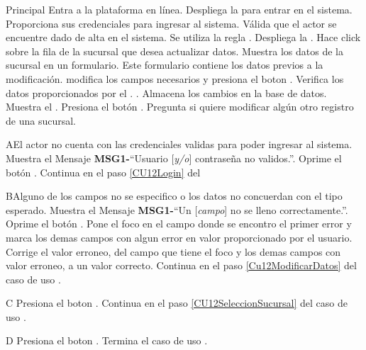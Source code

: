 	\begin{UCtrayectoria}{Principal}
		\UCpaso[\UCactor] Entra a la plataforma en línea. 
		\UCpaso Despliega la \label{CU12Login} para entrar en el sistema.
		\UCpaso[\UCactor] Proporciona sus credenciales para ingresar al sistema.
		\UCpaso Válida que el actor se encuentre dado de alta en el sistema. Se utiliza la regla  .
		\UCpaso Despliega la .\label{CU12SeleccionSucursal}
		\UCpaso[\UCactor] Hace click sobre la fila de la sucursal que desea actualizar datos.
		\UCpaso Muestra los datos de la sucursal en un formulario. Este formulario contiene los datos previos a la modificación.
		\UCpaso[\UCactor] modifica los campos necesarios y presiona el boton . \label{Cu12ModificarDatos}
		\UCpaso Verifica los datos proporcionados por el \UCactor.  .
		\UCpaso Almacena los cambios en la base de datos.
		\UCpaso Muestra el . 
		\UCpaso[\UCactor] Presiona el botón . 
		\UCpaso Pregunta si quiere modificar algún otro registro de una sucursal.  
	\end{UCtrayectoria}
	
		\begin{UCtrayectoriaA}{A}{El actor no cuenta con las credenciales validas para poder ingresar al sistema.}
			\UCpaso Muestra el Mensaje {\bf MSG1-}``Usuario [{\em y/o}] contraseña no validos.''.
			\UCpaso[\UCactor] Oprime el botón .
			\UCpaso Continua en el paso \ref{CU12Login} del 
		\end{UCtrayectoriaA}
		
		\begin{UCtrayectoriaA}{B}{Alguno de los campos no se especifico o los datos no concuerdan con el tipo esperado.}
			\UCpaso Muestra el Mensaje {\bf MSG1-}``Un [{\em campo}] no se lleno correctamente.''.
			\UCpaso[\UCactor] Oprime el botón .
			\UCpaso Pone el foco en el campo donde se encontro el primer error y marca los demas campos con algun error en valor proporcionado por el usuario.
			\UCpaso[\UCactor] Corrige el valor erroneo, del campo que tiene el foco y los demas campos con valor erroneo, a un valor correcto.
			\UCpaso Continua en el paso \ref{Cu12ModificarDatos} del caso de uso .
		\end{UCtrayectoriaA}
 
		\begin{UCtrayectoriaA}{C}{}
			\UCpaso[\UCactor] Presiona el boton .
			\UCpaso Continua en el paso \ref{CU12SeleccionSucursal} del caso de uso .
		\end{UCtrayectoriaA}
		
		\begin{UCtrayectoriaA}{D}{}
			\UCpaso[\UCactor] Presiona el boton .
			\UCpaso Termina el caso de uso .
		\end{UCtrayectoriaA}
